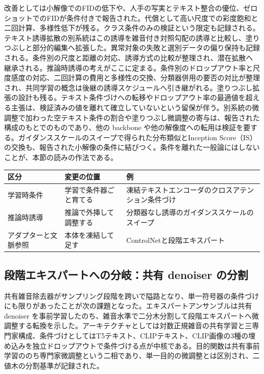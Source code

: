 \documentclass[lualatex,a4paper,10pt]{jlreq}
\begin{document}
改善としては小解像でのFIDの低下や、人手の写実とテキスト整合の優位、ゼロショットでのFIDが条件付きで報告された\autocite{btd032,btd033}。代償として高い尺度での彩度飽和と二回計算、多様性低下が残る\autocite{btd032}。クラス条件のみの検証という限定も記録される。テキスト誘導拡散の別系統はこの誘導を雑音付き対照勾配の誘導と比較し、塗りつぶしと部分的編集へ拡張した\autocite{btd033}。異常対象の失敗と選別データの偏り保持も記録される\autocite{btd033}。条件別の尺度と距離の対応、誘導方式の比較が整理され、潜在拡散へ継承される。推論時誘導の考えがここに定まる。条件別のドロップアウト率と尺度感度の対応、二回計算の費用と多様性の交換、分類器併用の要否の対比が整理され、共同学習の概念は後継の誘導スケジュールへ引き継がれる\autocite{btd032,btd033}。塗りつぶし拡張の設計も残る。テキスト条件づけへの転移やドロップアウト率の最適値を超える主張は、検証済みの値を離れて確立していないという留保が伴う。別系統の微調整で加わった空テキスト条件の割合や塗りつぶし微調整の寄与は、報告された構成のもとでのものであり、他の backbone や他の解像度への転用は検証を要する\autocite{btd033}。ガイダンススケールのスイープで得られた分布類似とInception Score（IS）の交換も、報告された小解像の条件に結びつく\autocite{btd032}。条件を離れた一般論にはしないことが、本節の読みの作法である。

\begin{center}
\small
\begin{tabularx}{\textwidth}{@{}p{}p{}X@{}}
\toprule
区分 & 変更の位置 & 例 \\
\midrule
学習時条件 & 学習で条件器ごと育てる & 凍結テキストエンコーダのクロスアテンション条件づけ \\
推論時誘導 & 推論で外挿して調整する & 分類器なし誘導のガイダンススケールのスイープ \\
アダプターと文脈参照 & 本体を凍結して足す & ControlNetと段階エキスパート \\
\bottomrule
\end{tabularx}
\end{center}

\subsection{段階エキスパートへの分岐：共有 denoiser の分割}
共有雑音除去器がサンプリング段階を跨いで隘路となり、単一符号器の条件づけにも限りがあったことが次の課題となった。エキスパートアンサンブルは共有 denoiser を事前学習したのち、雑音水準で二分木分割して段階エキスパートへ微調整する転換を示した\autocite{btd034}。アーキテクチャとしては対数正規雑音の共有学習と三専門家構成、条件づけとしてはT5テキスト、CLIPテキスト、CLIP画像の3種の埋め込みを独立ドロップアウトで条件づける点が中核である\autocite{btd034}。目的関数は共有事前学習ののち専門家微調整という二相であり、単一目的の微調整とは区別され、二値木の分割基準が記録された\autocite{btd034}。
\end{document}
